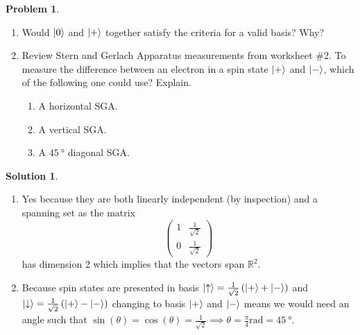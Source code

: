 \documentclass[10pt]{article}
\theoremstyle{definition}
\newtheorem{problem}{Problem}
\newtheorem{soln}{Solution}
\begin{document}
\begin{problem}~
\begin{enumerate}[label=(\alph*)]
  \item Would $\ket{0}$ and $\ket{+}$ together satisfy the criteria for a valid basis? Why?
  \item Review Stern and Gerlach Apparatus measurements from worksheet \#2. To measure
        the difference between an electron in a spin state $\ket{+}$ and $\ket{-}$, which of the following
        one could use? Explain.
        \begin{enumerate}[label=(\Roman*)]
          \item A horizontal SGA.
          \item A vertical SGA.
          \item A $\qty{45}{\degree}$ diagonal SGA.
        \end{enumerate}
\end{enumerate}
\end{problem}
\begin{soln} ~
  \begin{enumerate}[label=(\alph*)]
    \item Yes because they are both linearly independent (by inspection) and a spanning set as the matrix
          $$\begin{pmatrix}
              1 & \frac{1}{\sqrt{2}} \\
              0 & \frac{1}{\sqrt{2}}
            \end{pmatrix}$$
          has dimension 2 which implies that the vectors span $\mathbb{R}^2$.
    \item Because spin states are presented in basis $\ket{\uparrow}=\frac{1}{\sqrt{2}}\left(\ket{+}+\ket{-}\right)$ and
          $\ket{\downarrow}=\frac{1}{\sqrt{2}}\left(\ket{+}-\ket{-}\right)$ changing to basis $\ket{+}$ and $\ket{-}$ means we would need an angle such that
          $\sin(\theta)=\cos(\theta)=\frac{1}{\sqrt{2}}\implies\theta=\frac{\pi}{4}\unit{\radian}=\qty{45}{\degree}$.
  \end{enumerate}
\end{soln}
\newpage
\end{document}
